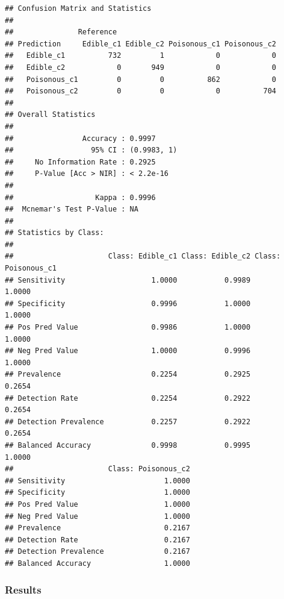 \documentclass[10pt  ,usenames, dvipsnames]{article}\usepackage[]{graphicx}\usepackage[]{color}
\makeatletter
\newenvironment{kframe}{%
 \def\at@end@of@kframe{}%
 \ifinner\ifhmode%
  \def\at@end@of@kframe{\end{minipage}}%
  \begin{minipage}{\columnwidth}%
 \fi\fi%
 \def\FrameCommand##1{\hskip\@totalleftmargin \hskip-\fboxsep
 \colorbox{shadecolor}{##1}\hskip-\fboxsep
     \hskip-\linewidth \hskip-\@totalleftmargin \hskip\columnwidth}%
 \MakeFramed {\advance\hsize-\width
   \@totalleftmargin\z@ \linewidth\hsize
   \@setminipage}}%
 {\par\unskip\endMakeFramed%
 \at@end@of@kframe}
\newenvironment{knitrout}{}{} %
\makeatother
\begin{document}
\begin{knitrout}
\color{fgcolor}\begin{kframe}
\begin{verbatim}
## Confusion Matrix and Statistics
## 
##               Reference
## Prediction     Edible_c1 Edible_c2 Poisonous_c1 Poisonous_c2
##   Edible_c1          732         1            0            0
##   Edible_c2            0       949            0            0
##   Poisonous_c1         0         0          862            0
##   Poisonous_c2         0         0            0          704
## 
## Overall Statistics
##                                      
##                Accuracy : 0.9997     
##                  95% CI : (0.9983, 1)
##     No Information Rate : 0.2925     
##     P-Value [Acc > NIR] : < 2.2e-16  
##                                      
##                   Kappa : 0.9996     
##  Mcnemar's Test P-Value : NA         
## 
## Statistics by Class:
## 
##                      Class: Edible_c1 Class: Edible_c2 Class: Poisonous_c1
## Sensitivity                    1.0000           0.9989              1.0000
## Specificity                    0.9996           1.0000              1.0000
## Pos Pred Value                 0.9986           1.0000              1.0000
## Neg Pred Value                 1.0000           0.9996              1.0000
## Prevalence                     0.2254           0.2925              0.2654
## Detection Rate                 0.2254           0.2922              0.2654
## Detection Prevalence           0.2257           0.2922              0.2654
## Balanced Accuracy              0.9998           0.9995              1.0000
##                      Class: Poisonous_c2
## Sensitivity                       1.0000
## Specificity                       1.0000
## Pos Pred Value                    1.0000
## Neg Pred Value                    1.0000
## Prevalence                        0.2167
## Detection Rate                    0.2167
## Detection Prevalence              0.2167
## Balanced Accuracy                 1.0000
\end{verbatim}
\end{kframe}
\end{knitrout}


\clearpage
\subsubsection{Results}
\end{document}
